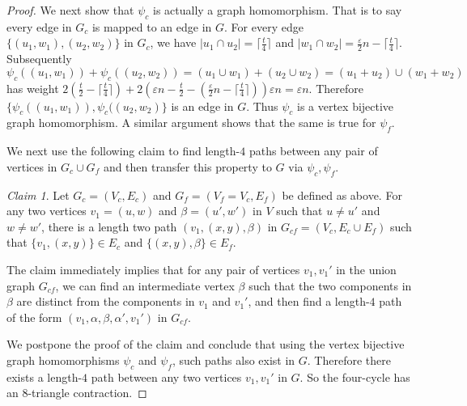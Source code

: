 \documentclass[10pt,a4paper]{article}
\theoremstyle{definition}
\theoremstyle{remark}
\newtheorem{claim}[theorem]{Claim}
\newcommand{\card}[1]{\lvert#1\rvert}
\numberwithin{equation}{section}
\newcommand{\ceil}[1]{\lceil #1 \rceil}
\begin{document}
\begin{proof}
    We next show that $\psi_c$ is actually a graph homomorphism. That is to say every edge in $G_c$ is mapped to an edge in $G$.
    For every edge \(\{(u_1,w_1),(u_2,w_2)\}\) in $G_c$, we have \(\card{u_1\cap u_2} = \ceil{\frac{t}{4}}\) and \(\card{w_1\cap w_2} =\frac{\varepsilon}{2}n-\ceil{\frac{t}{4}}\). Subsequently 
    \[\psi_c((u_1, w_1)) + \psi_c((u_2, w_2)) = (u_1\cup w_1)+(u_2\cup w_2) = (u_1+u_2)\cup(w_1+w_2)  \]
    has weight \(2(\frac{t}{2}-\ceil{\frac{t}{4}}) + 2 ( \varepsilon n-\frac{t}{2}- (\frac{\varepsilon}{2}n-\ceil{\frac{t}{4}}))\varepsilon n = \varepsilon n\). Therefore $\{\psi_c((u_1, w_1)), \psi_c((u_2, w_2)\}$ is an edge in \(G\). Thus $\psi_c$ is a vertex bijective graph homomorphism. A similar argument shows that the same is true for $\psi_f$.

    We next use the following claim to find length-$4$ paths between any pair of vertices in $G_c \cup G_f$ and then transfer this property to $G$ via $\psi_c,\psi_f$.
    \begin{claim}\label{claim:2-step-Johnson}
        Let $G_c = (V_c,E_c)$ and $G_f = (V_f=V_c,E_f)$ be defined as above.
        For any two vertices $v_1 = (u,w)$ and $\beta =(u',w')$ in $V$ such that $u\neq u'$ and $w \neq w'$, there is a length two path $(v_1,(x,y),\beta)$ in $G_{cf}=(V_c,E_c\cup E_f)$ such that $\{v_1,(x,y)\} \in E_c$ and $\{(x,y),\beta\} \in E_f$.
    \end{claim}
    The claim immediately implies that for any pair of vertices $v_1,v_1'$ in the union graph $G_{cf}$, we can find an intermediate vertex $\beta$ such that the two components in $\beta$ are distinct from the components in $v_1$ and $v_1'$, and then find a length-$4$ path of the form $(v_1,\alpha,\beta,\alpha',v_1')$ in $G_{cf}$.
    
    We postpone the proof of the claim and conclude that using the vertex bijective graph homomorphisms $\psi_c$ and $\psi_f$, such paths also exist in $G$. Therefore there exists a length-$4$ path between any two vertices $v_1,v_1'$ in $G$. So the four-cycle has an $8$-triangle contraction.
\end{proof}
\end{document}
